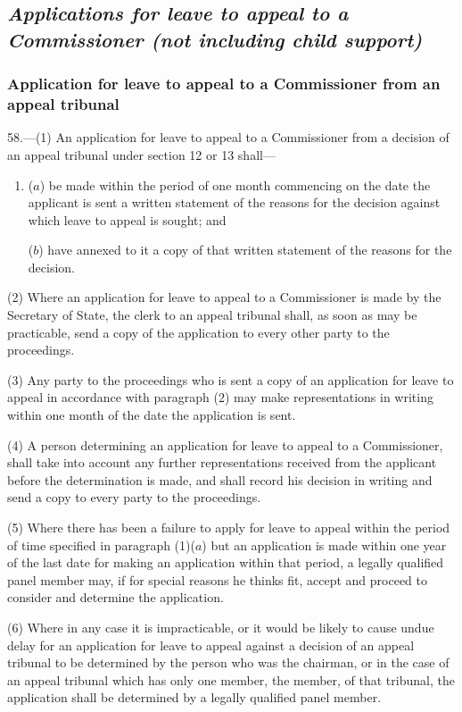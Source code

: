 \documentclass[12pt,a4paper]{article}
\begin{document}
\subsection{\itshape Applications for leave to appeal to a Commissioner (not including child support)}

\subsubsection[58. Application for leave to appeal to a Commissioner from an appeal tribunal]{Application for leave to appeal to a Commissioner from an appeal tribunal}

58.—(1) An application for leave to appeal to a Commissioner from a decision of an appeal tribunal under section 12 or 13 shall—
\begin{enumerate}\item[]
($a$) be made within the period of one month commencing on the date the applicant is sent a written statement of the reasons for the decision against which leave to appeal is sought; and

($b$) have annexed to it a copy of that written statement of the reasons for the decision.
\end{enumerate}

(2) Where an application for leave to appeal to a Commissioner is made by the Secretary of State, the clerk to an appeal tribunal shall, as soon as may be practicable, send a copy of the application to every other party to the proceedings.

(3) Any party to the proceedings who is sent a copy of an application for leave to appeal in accordance with paragraph (2) may make representations in writing within one month of the date the application is sent.

(4) A person determining an application for leave to appeal to a Commissioner, shall take into account any further representations received from the applicant before the determination is made, and shall record his decision in writing and send a copy to every party to the proceedings.

(5) Where there has been a failure to apply for leave to appeal within the period of time specified in paragraph (1)($a$) but an application is made within one year of the last date for making an application within that period, a legally qualified panel member may, if for special reasons he thinks fit, accept and proceed to consider and determine the application.

(6) Where in any case it is impracticable, or it would be likely to cause undue delay for an application for leave to appeal against a decision of an appeal tribunal to be determined by the person who was the chairman, or in the case of an appeal tribunal which has only one member, the member, of that tribunal, the application shall be determined by a legally qualified panel member.
\end{document}
